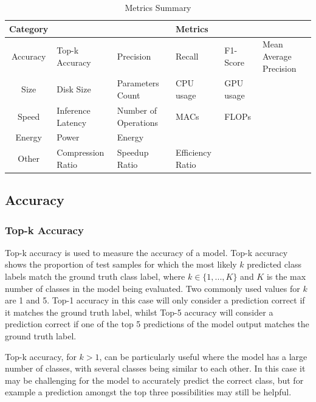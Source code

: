 \setlength{\arrayrulewidth}{0.1mm}
\setlength{\tabcolsep}{2pt}
\renewcommand{\arraystretch}{1.75}
\begin{table}[]
    \centering
    \begin{tabular}{| c | l l l l l |} 
        \hline
        Category &  & & Metrics & &  \\
        \hline
        Accuracy & Top-k Accuracy &  Precision & Recall & F1-Score & Mean Average Precision \\ 
        Size     & Disk Size &  Parameters Count & CPU usage & GPU usage &  \\  
        Speed    & Inference Latency &  Number of Operations & MACs & FLOPs &   \\ 
        Energy   & Power &  Energy &  &  &  \\ 
        Other    & Compression Ratio & Speedup Ratio &  Efficiency Ratio &  & \\ 
        \hline
    \end{tabular}
    \caption{Metrics Summary}
    \label{tab:metrics_summary}
\end{table}

\subsection{Accuracy}
\subsubsection{Top-k Accuracy}
Top-k accuracy is used to measure the accuracy of a model.%
%
Top-k accuracy shows the proportion of test samples for which the most likely $k$ predicted class labels match the ground truth class label, where $k \in \{1, ...,  K\}$ and $K$ is the max number of classes in the model being evaluated.
%
Two commonly used values for $k$ are 1 and 5. Top-1 accuracy in this case will only consider a prediction correct if it matches the ground truth label, whilst Top-5 accuracy will consider a prediction correct if one of the top 5 predictions of the model output matches the ground truth label. 

Top-k accuracy, for $k>1$, can be particularly useful where the model has a large number of classes, with several classes being similar to each other. 
%
In this case it may be challenging for the model to accurately predict the correct class, but for example a prediction amongst the top three possibilities may still be helpful.

